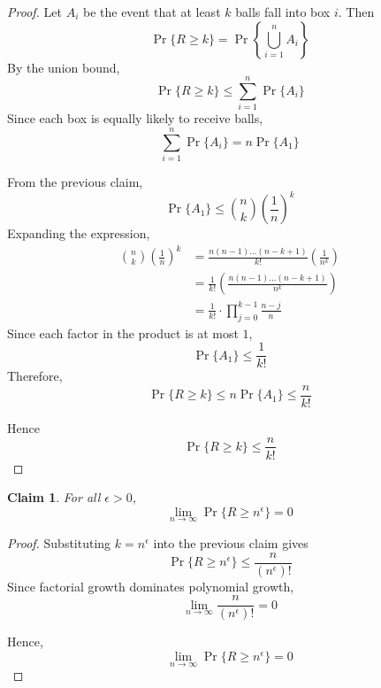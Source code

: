\documentclass{article}
\newtheorem{claim}{Claim}
\begin{document}
\begin{proof}
    Let $A_i$ be the event that at least $k$ balls fall into box $i$. Then
    \[
    \Pr\{R \geq k\} = \Pr\left\{\bigcup_{i=1}^{n}A_i\right\}
    \]
    By the union bound,
    \[
    \Pr\{R \geq k\} \leq \sum_{i=1}^{n}\Pr\{A_i\}
    \]
    Since each box is equally likely to receive balls,
    \[
    \sum_{i=1}^{n}\Pr\{A_i\} = n\Pr\{A_1\}
    \]

    \medskip

    From the previous claim, 
    \[
    \Pr\{A_1\} \leq \binom{n}{k}\left(\frac{1}{n}\right)^k
    \]
    Expanding the expression, 
    \[
    \begin{aligned}
    \binom{n}{k}\left(\frac{1}{n}\right)^k &= \frac{n(n - 1)\dots(n - k + 1)}{k!}\left(\frac{1}{n^k}\right) \\
    &= \frac{1}{k!}\left(\frac{n(n - 1)\dots(n - k + 1)}{n^k}\right) \\
    &= \frac{1}{k!} \cdot \prod_{j=0}^{k-1}\frac{n-j}{n}
    \end{aligned}
    \]
    Since each factor in the product is at most $1$,
    \[
    \Pr\{A_1\} \leq \frac{1}{k!}
    \]
    Therefore, 
    \[
    \Pr\{R \geq k\} \leq n\Pr\{A_1\} \leq \frac{n}{k!}
    \]

    \medskip

    Hence 
    \[
    \Pr\{R \geq k\} \leq \frac{n}{k!}
    \]
\end{proof}

\begin{claim}
    For all $\epsilon > 0$,
    \[
    \lim_{n \to \infty}\Pr\{R \geq n^\epsilon\} = 0
    \]
\end{claim}

\begin{proof}
    Substituting $k=n^\epsilon$ into the previous claim gives
    \[
    \Pr\{R \geq n^\epsilon\} \leq \frac{n}{(n^\epsilon)!}
    \]
    Since factorial growth dominates polynomial growth,
    \[
    \lim_{n \to \infty}\frac{n}{(n^\epsilon)!} = 0
    \]

    \medskip

    Hence,
    \[
    \lim_{n \to \infty}\Pr\{R \geq n^\epsilon\} = 0
    \]
\end{proof}
\end{document}
